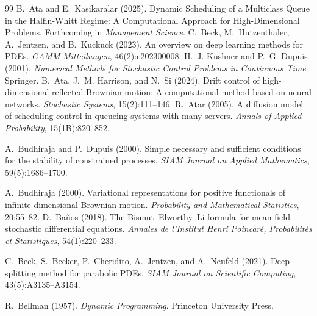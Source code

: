 \documentclass[11pt]{article}
\theoremstyle{definition}
\theoremstyle{plain}
\begin{document}
\begin{appendices}
\begin{thebibliography}{99}
 B.~Ata and E.~Kasikaralar (2025). \newblock Dynamic Scheduling of a Multiclass Queue in the Halfin-Whitt Regime: A Computational Approach for High-Dimensional Problems. \newblock Forthcoming in \emph{Management Science}.
 C.~Beck, M.~Hutzenthaler, A.~Jentzen, and B.~Kuckuck (2023). \newblock An overview on deep learning methods for PDEs. \newblock \emph{GAMM-Mitteilungen}, 46(2):e202300008.
 H.~J. Kushner and P.~G. Dupuis (2001). \newblock \emph{Numerical Methods for Stochastic Control Problems in Continuous Time}. \newblock Springer.
 B.~Ata, J.~M. Harrison, and N.~Si (2024). \newblock Drift control of high-dimensional reflected Brownian motion: A computational method based on neural networks. \newblock \emph{Stochastic Systems}, 15(2):111--146. %
 R.~Atar (2005). \newblock A diffusion model of scheduling control in queueing systems with many servers. \newblock \emph{Annals of Applied Probability}, 15(1B):820--852.

 A.~Budhiraja and P.~Dupuis (2000). \newblock Simple necessary and sufficient conditions for the stability of constrained processes. \newblock \emph{SIAM Journal on Applied Mathematics}, 59(5):1686--1700.

 A.~Budhiraja (2000). \newblock Variational representations for positive functionals of infinite dimensional Brownian motion. \newblock \emph{Probability and Mathematical Statistics}, 20:55--82. %
 D.~Ba\~nos (2018). \newblock The Bismut--Elworthy--Li formula for mean-field stochastic differential equations. \newblock \emph{Annales de l'Institut Henri Poincar\'e, Probabilit\'es et Statistiques}, 54(1):220--233.

 C.~Beck, S.~Becker, P.~Cheridito, A.~Jentzen, and A.~Neufeld (2021). \newblock Deep splitting method for parabolic PDEs. \newblock \emph{SIAM Journal on Scientific Computing}, 43(5):A3135--A3154. %

 R.~Bellman (1957). \newblock \emph{Dynamic Programming}. \newblock Princeton University Press.


\end{thebibliography}
\end{appendices}
\end{document}
